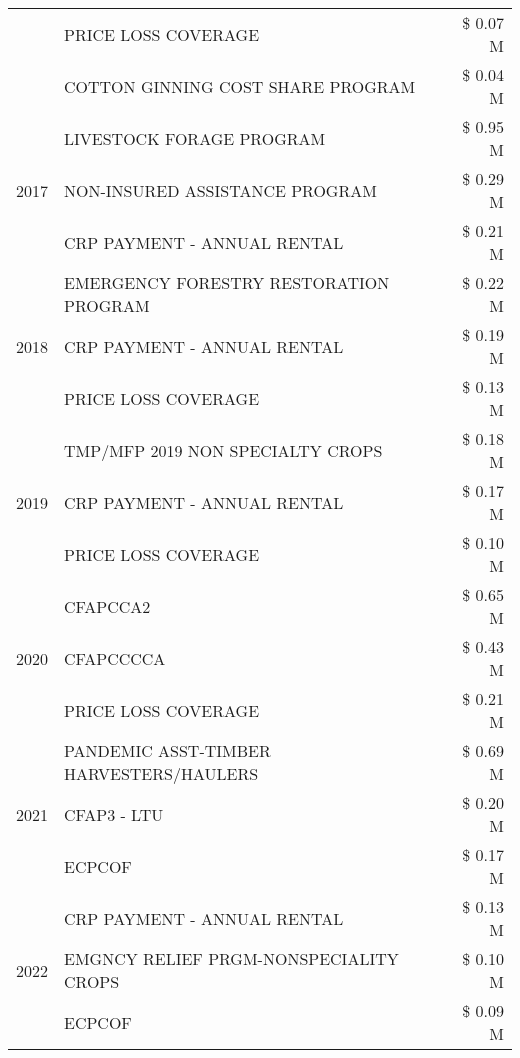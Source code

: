 \begin{tabular}{llr}
 & PRICE LOSS COVERAGE & \$ 0.07 M \\
 & COTTON GINNING COST SHARE PROGRAM & \$ 0.04 M \\
\cline{1-3}
\multirow[t]{3}{*}{2017} & LIVESTOCK FORAGE PROGRAM & \$ 0.95 M \\
 & NON-INSURED ASSISTANCE PROGRAM & \$ 0.29 M \\
 & CRP PAYMENT - ANNUAL RENTAL & \$ 0.21 M \\
\cline{1-3}
\multirow[t]{3}{*}{2018} & EMERGENCY FORESTRY RESTORATION PROGRAM & \$ 0.22 M \\
 & CRP PAYMENT - ANNUAL RENTAL & \$ 0.19 M \\
 & PRICE LOSS COVERAGE & \$ 0.13 M \\
\cline{1-3}
\multirow[t]{3}{*}{2019} & TMP/MFP 2019 NON SPECIALTY CROPS & \$ 0.18 M \\
 & CRP PAYMENT - ANNUAL RENTAL & \$ 0.17 M \\
 & PRICE LOSS COVERAGE & \$ 0.10 M \\
\cline{1-3}
\multirow[t]{3}{*}{2020} & CFAPCCA2 & \$ 0.65 M \\
 & CFAPCCCCA & \$ 0.43 M \\
 & PRICE LOSS COVERAGE & \$ 0.21 M \\
\cline{1-3}
\multirow[t]{3}{*}{2021} & PANDEMIC ASST-TIMBER HARVESTERS/HAULERS & \$ 0.69 M \\
 & CFAP3 - LTU & \$ 0.20 M \\
 & ECPCOF & \$ 0.17 M \\
\cline{1-3}
\multirow[t]{3}{*}{2022} & CRP PAYMENT - ANNUAL RENTAL & \$ 0.13 M \\
 & EMGNCY RELIEF PRGM-NONSPECIALITY CROPS & \$ 0.10 M \\
 & ECPCOF & \$ 0.09 M \\
\cline{1-3}
\bottomrule
\end{tabular}
